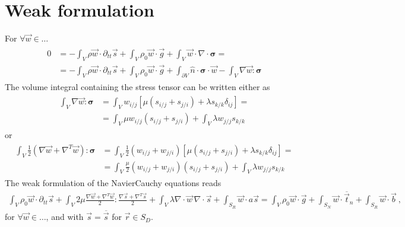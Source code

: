 \documentclass[letterpaper,10pt,english]{jupyterBook}
\begin{document}
\section{Weak formulation}
\label{\detokenize{ch/pde/nc:weak-formulation}}
\sphinxAtStartPar
For \(\forall \vec{w} \in \dots\)
\begin{equation*}
\begin{split}\begin{aligned}
  0
  & = - \int_V \rho \vec{w} \cdot \partial_{tt} \vec{s} + \int_V \rho_0 \vec{w} \cdot \vec{g} + \int_{V} \vec{w} \cdot \nabla \cdot \symbf{\sigma} = \\ 
  & = - \int_V \rho \vec{w} \cdot \partial_{tt} \vec{s} + \int_V \rho_0 \vec{w} \cdot \vec{g} + \int_{\partial V} \hat{n} \cdot \symbf{\sigma} \cdot \vec{w} - \int_{V} \nabla \vec{w} : \symbf{\sigma} 
\end{aligned}\end{split}
\end{equation*}
\sphinxAtStartPar
The volume integral containing the stress tensor can be written either as
\begin{equation*}
\begin{split}\begin{aligned}
  \int_V \nabla \vec{w} : \symbf{\sigma} 
  & = \int_V w_{i/j} \left[ \mu \left( s_{i/j} + s_{j/i} \right) + \lambda s_{k/k} \delta_{ij} \right] = \\
  & = \int_V \mu w_{i/j} \left( s_{i/j} + s_{j/i} \right) + \int_V \lambda w_{j/j} s_{k/k} 
\end{aligned}\end{split}
\end{equation*}
\sphinxAtStartPar
or
\begin{equation*}
\begin{split}\begin{aligned}
  \int_V \frac{1}{2} \left( \nabla \vec{w} + \nabla^T \vec{w} \right) : \symbf{\sigma} 
  & = \int_V \frac{1}{2} \left( w_{i/j} + w_{j/i} \right) \left[ \mu \left( s_{i/j} + s_{j/i} \right) + \lambda s_{k/k} \delta_{ij} \right] = \\
  & = \int_V \frac{\mu}{2} \left( w_{i/j} + w_{j/i} \right) \left( s_{i/j} + s_{j/i} \right) + \int_{V} \lambda w_{j/j} s_{k/k} 
\end{aligned}\end{split}
\end{equation*}
\sphinxAtStartPar
The weak formulation of the Navier\sphinxhyphen{}Cauchy equations reads
\begin{equation*}
\begin{split}\int_V \rho_0 \vec{w} \cdot \partial_{tt} \vec{s} + \int_{V} 2 \mu \frac{\nabla \vec{w} + \nabla^T \vec{w}}{2} : \frac{\nabla \vec{s} + \nabla^T \vec{s}}{2} + \int_{V} \lambda \nabla \cdot \vec{w} \, \nabla \cdot \vec{s} + \int_{S_R} \vec{w} \cdot a \vec{s} = \int_{V} \rho_0 \vec{w} \cdot \vec{g} + \int_{S_N} \vec{w} \cdot \overline{\vec{t}}_n + \int_{S_R} \vec{w} \cdot \vec{b} \ ,\end{split}
\end{equation*}
\sphinxAtStartPar
for \(\forall \vec{w} \in \dots\), and with \(\vec{s} = \overline{\vec{s}}\) for \(\vec{r} \in S_D\).
\end{document}
